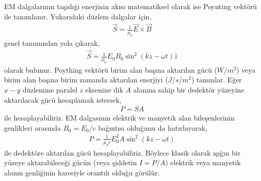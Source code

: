 \documentclass[00_kitap.tex]{subfiles}
\begin{document}
EM dalgalarının taşıdığı enerjinin akısı matematiksel olarak ise Poynting vektörü ile tanımlanır. Yukarıdaki düzlem dalgalar için,
\begin{align}
\label{eq:poynting_vec}
\vec S = \frac{1}{\mu_0}\vec E \times \vec B
\end{align}
genel tanımından yola çıkarak,
\begin{align}
\label{eq:poynting_plane_wave}
\vec S = \frac{1}{\mu_0} E_0 B_0 \sin^2(kz-\omega t)\hat z
\end{align}
olarak bulunur. Poything vektörü birim alan başına aktarılan gücü ($W/m^2$) veya birim alan başına birim zamanda aktarılan enerjiyi ($J/s/m^2$) tanımlar. Eğer $x-y$ düzlemine paralel $z$ eksenine dik $A$ alanına sahip bir dedektör yüzeyine aktarılacak gücü hesaplamak istersek,
\begin{align}
\label{eq:poynting_power1}
P = S A
\end{align}
ile hesaplayabiliriz. EM dalgasının elektrik ve manyetik alan bileşenlerinin genlikleri arasında $B_0 = E_0/c$ bağıntısı olduğunu da hatırlayarak,
\begin{align}
\label{eq:poynting_power2}
P = \frac{1}{\mu_0 c} E_0^2 A \sin^2(kz-\omega t)
\end{align}
ile dedektöre aktarılan gücü hesaplayabiliriz. Böylece klasik olarak ışığın bir yüzeye aktarabileceği gücün (veya şiddetin $I = P/A$) elektrik veya manyetik alanın genliğinin karesiyle orantılı olduğu görülür.
\end{document}
